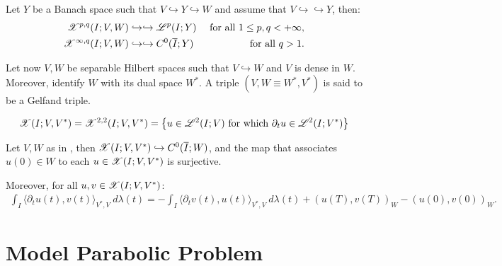 \begin{theorem}
    Let $Y$ be a Banach space such that $V \hookrightarrow Y \hookrightarrow W$ and assume that $V \hookrightarrow \hookrightarrow Y$, then:
    \begin{align}
        \mathscr{X}^{p, q}(I; V, W) &\hookrightarrow \hookrightarrow \mathscr{L}^{p}(I; Y) &\text{ for all } 1 \leq p, q < +\infty,\\
        \mathscr{X}^{\infty, q}(I; V, W) &\hookrightarrow \hookrightarrow C^0(\overline{I}; Y) &\text{ for all } q > 1.
    \end{align}
\end{theorem}

\begin{definition} \label{definition:gelfand}
    Let now $V, W$ be separable Hilbert spaces such that $V \hookrightarrow W$ and $V$ is dense in $W$. Moreover, identify $W$ with its dual space $W^*$. A triple $\left( V, W \equiv W^*, V^* \right)$ is said to be a Gelfand triple.
\end{definition}

\begin{definition}[$\SpaceX(I; V, V^*)$] \label{definition:x}
    \begin{align}
        \mathscr{X}(I; V, V^*) = \mathscr{X}^{2, 2}(I; V, V^*) = \left\{ u \in \mathscr{L}^{2}(I; V) \text{ for which } \partial_t u \in \mathscr{L}^{2}(I; V^*) \right\}
    \end{align}
\end{definition}

\begin{theorem}
    Let $V, W$ as in , then \newline \nobreak $\mathscr{X}(I; V, V^*) \hookrightarrow C^0(\overline{I};W)$, and the map that associates $u(0) \in W$ to each $u \in \mathscr{X}(I; V, V^*)$ is surjective.

    Moreover, for all $u, v \in \mathscr{X}(I; V, V^*)$:
    \begin{align}
        \int_I \langle \partial_t u(t), v(t) \rangle_{V^*, V} ~ d \lambda(t) = - \int_I \langle \partial_t v(t), u(t) \rangle_{V^*, V} ~ d \lambda(t) + \left( u(T), v(T) \right)_W - \left( u(0), v(0) \right)_W.
    \end{align}
\end{theorem}

\newpage
\section{Model Parabolic Problem}

